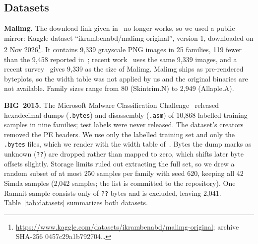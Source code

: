 \documentclass[conference]{IEEEtran}
\begin{document}
\subsection{Datasets}
\textbf{Malimg.} The download link given in~\cite{nataraj2011images} no longer works,
so we used a public mirror:
Kaggle dataset ``ikrambenabd/malimg-original'', version 1, downloaded on 2 Nov 2026\footnote{\url{https://www.kaggle.com/datasets/ikrambenabd/malimg-original}; archive SHA-256 0457c29a1b792704\ldots}.
It contains 9,339 grayscale PNG images in 25 families, 119 fewer than the 9,458
reported in~\cite{nataraj2011images}; recent work~\cite{tariq2026framework} uses the
same 9,339 images, and a recent survey~\cite{brosolo2024sok} gives 9,339 as the size of
Malimg. Malimg ships as pre-rendered byteplots, so the width table was not
applied by us and the original binaries are not available. Family sizes range from 80
(Skintrim.N) to 2,949 (Allaple.A).

\textbf{BIG~2015.} The Microsoft Malware Classification Challenge~\cite{ronen2018big2015}
released hexadecimal dumps (\texttt{.bytes}) and disassembly (\texttt{.asm}) of 10,868
labelled training samples in nine families; test labels were never released. The
dataset's creators removed the PE headers. We use only the labelled training set and
only the \texttt{.bytes} files, which we render with the width table
of~\cite{nataraj2011images}. Bytes the dump marks as unknown (\texttt{??}) are dropped
rather than mapped to zero, which shifts later byte offsets slightly. Storage limits
ruled out extracting the full set, so we drew a random subset of at most 250 samples
per family with seed 620, keeping all 42 Simda samples (2,042 samples; the list is
committed to the repository). One Ramnit sample consists only of \texttt{??} bytes and
is excluded, leaving 2,041. Table~\ref{tab:datasets} summarizes both datasets.
\end{document}
